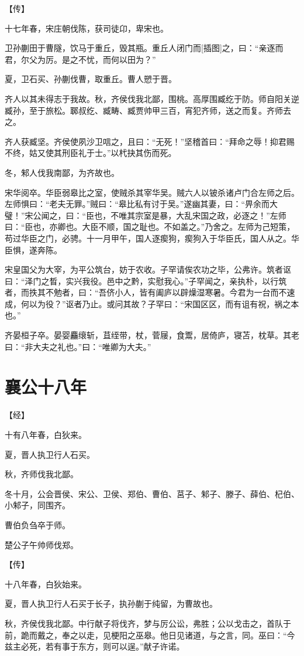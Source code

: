 \documentclass[a4paper,12pt,UTF8,twoside]{ctexbook}
\begin{document}
【传】

十七年春，宋庄朝伐陈，获司徒卬，卑宋也。

卫孙蒯田于曹隧，饮马于重丘，毁其瓶。重丘人闭门而[插图]之，曰：“亲逐而君，尔父为厉。是之不忧，而何以田为？”

夏，卫石买、孙蒯伐曹，取重丘。曹人愬于晋。

齐人以其未得志于我故。秋，齐侯伐我北鄙，围桃。高厚围臧纥于防。师自阳关逆臧孙，至于旅松。郰叔纥、臧畴、臧贾帅甲三百，宵犯齐师，送之而复。齐师去之。

齐人获臧坚。齐侯使夙沙卫唁之，且曰：“无死！”坚稽首曰：“拜命之辱！抑君赐不终，姑又使其刑臣礼于士。”以杙抉其伤而死。

冬，邾人伐我南鄙，为齐故也。

宋华阅卒。华臣弱皋比之室，使贼杀其宰华吴。贼六人以铍杀诸卢门合左师之后。左师惧曰：“老夫无罪。”贼曰：“皋比私有讨于吴。”遂幽其妻，曰：“畀余而大璧！”宋公闻之，曰：“臣也，不唯其宗室是暴，大乱宋国之政，必逐之！”左师曰：“臣也，亦卿也。大臣不顺，国之耻也。不如盖之。”乃舍之。左师为己短策，苟过华臣之门，必骋。十一月甲午，国人逐瘈狗，瘈狗入于华臣氏，国人从之。华臣惧，遂奔陈。

宋皇国父为大宰，为平公筑台，妨于农收。子罕请俟农功之毕，公弗许。筑者讴曰：“泽门之晳，实兴我役。邑中之黔，实慰我心。”子罕闻之，亲执朴，以行筑者，而抶其不勉者，曰：“吾侪小人，皆有阖庐以辟燥湿寒暑。今君为一台而不速成，何以为役？”讴者乃止。或问其故？子罕曰：“宋国区区，而有诅有祝，祸之本也。”

齐晏桓子卒。晏婴麤缞斩，苴绖带，杖，菅屦，食鬻，居倚庐，寝苫，枕草。其老曰：“非大夫之礼也。”曰：“唯卿为大夫。”

\section{襄公十八年}


【经】

十有八年春，白狄来。

夏，晋人执卫行人石买。

秋，齐师伐我北鄙。

冬十月，公会晋侯、宋公、卫侯、郑伯、曹伯、莒子、邾子、滕子、薛伯、杞伯、小邾子，同围齐。

曹伯负刍卒于师。

楚公子午帅师伐郑。

【传】

十八年春，白狄始来。

夏，晋人执卫行人石买于长子，执孙蒯于纯留，为曹故也。

秋，齐侯伐我北鄙。中行献子将伐齐，梦与厉公讼，弗胜；公以戈击之，首队于前，跪而戴之，奉之以走，见梗阳之巫皋。他日见诸道，与之言，同。巫曰：“今兹主必死，若有事于东方，则可以逞。”献子许诺。
\end{document}
